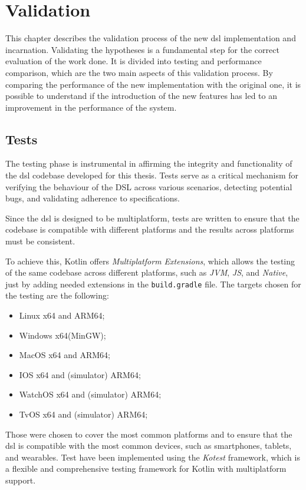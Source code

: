 
\chapter{Validation}
\label{ch:validation}
This chapter describes the validation process of the new \ac{dsl} implementation and incarnation.
Validating the hypotheses is a fundamental step for the correct evaluation of the work done.
It is divided into testing and performance comparison, which are the two main aspects of this validation process.
By comparing the performance of the new implementation with the original one, it is possible to understand if the
introduction of the new features has led to an improvement in the performance of the system.

\section{Tests}
\label{sec:tests}
The testing phase is instrumental in affirming the integrity and functionality of the \ac{dsl} codebase developed for this thesis.
Tests serve as a critical mechanism for verifying the behaviour of the DSL across various scenarios, detecting potential bugs,
and validating adherence to specifications.

Since the \ac{dsl} is designed to be multiplatform, tests are written to ensure that the codebase is compatible with
different platforms and the results across platforms must be consistent.

To achieve this, Kotlin offers \emph{Multiplatform Extensions}, which allows the testing of the same codebase across
different platforms, such as \emph{JVM}, \emph{JS}, and \emph{Native}, just by adding needed extensions in the \texttt{build.gradle} file.
The targets chosen for the testing are the following:
\begin{itemize}
    \item Linux x64 and ARM64;
    \item Windows x64(MinGW);
    \item MacOS x64 and ARM64;
    \item IOS x64 and (simulator) ARM64;
    \item WatchOS x64 and (simulator) ARM64;
    \item TvOS x64 and (simulator) ARM64;
\end{itemize}

Those were chosen to cover the most common platforms and to ensure that the \ac{dsl} is compatible with the most common
devices, such as smartphones, tablets, and wearables.
Test have been implemented using the \emph{Kotest} framework, which is a flexible and comprehensive testing framework for Kotlin
with multiplatform support.

